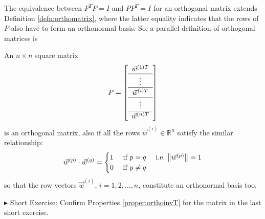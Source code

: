 The equivalence between $P^TP=I$ and $PP^T = I$ for an orthogonal matrix extends Definition \ref{defn:orthomatrix}, where the latter equality indicates that the rows of $P$ also have to form an orthonormal basis. So, a parallel definition of orthogonal matrices is
\begin{defn}
An $n \times n$ square matrix
\begin{align*}
P = \left[
\begin{array}{c}
\vec{w}^{(1)T}\\
\hline
\vdots \\
\hline
\vec{w}^{(i)T} \Tstrut \\
\hline
\vdots \\
\hline
\vec{w}^{(n)T} \Tstrut 
\end{array}
\right]
\end{align*}
is an orthogonal matrix, also if all the rows $\vec{w}^{(i)} \in \mathbb{R}^n$ satisfy the similar relationship:
\begin{align}
\vec{w}^{(p)} \cdot \vec{w}^{(q)} =
\begin{cases}
1 &\text{ if } p = q \quad \text{ i.e.\ } \norm{\vec{w}^{(p)}} = 1 \\
0 &\text{ if } p \neq q    
\end{cases}
\end{align}
so that the row vectors $\vec{w}^{(i)}$, $i=1,2,\ldots,n$, constitute an orthonormal basis too.
\end{defn}

$\blacktriangleright$ Short Exercise: Confirm Properties \ref{proper:orthoinvT} for the matrix in the last short exercise.\footnotemark

